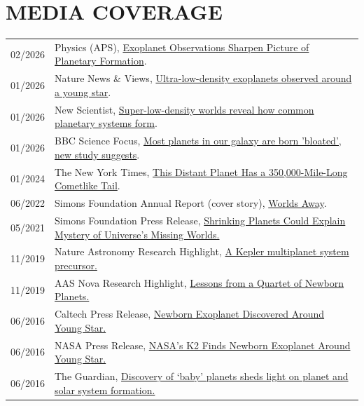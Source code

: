 \section{\large MEDIA COVERAGE}
\begin{tabular}{ll}
02/2026 & Physics (APS), \href{https://physics.aps.org/articles/v19/27}{Exoplanet Observations Sharpen Picture of Planetary Formation}.\\
01/2026 & Nature News \& Views, \href{https://www.nature.com/articles/d41586-025-03983-9}{Ultra-low-density exoplanets observed around a young star}.\\
01/2026 & New Scientist, \href{https://www.newscientist.com/article/2510539-super-low-density-worlds-reveal-how-common-planetary-systems-form/}{Super-low-density worlds reveal how common planetary systems form}.\\
01/2026 & BBC Science Focus, \href{https://www.sciencefocus.com/news/missing-link-planet-forming}{Most planets in our galaxy are born 'bloated', new study suggests}.\\
01/2024 & The New York Times, \href{https://www.nytimes.com/2024/01/12/science/wasp-69b-tail-planet.html}{This Distant Planet Has a 350,000-Mile-Long Cometlike Tail}.\\ 
06/2022 & Simons Foundation Annual Report (cover story), \href{https://annualreports.simonsfoundation.org/2021/worlds-away/}{Worlds Away}.\\
05/2021 & Simons Foundation Press Release, \href{https://www.simonsfoundation.org/2021/05/14/shrinking-planets-could-explain-mystery-of-universes-missing-worlds/}{Shrinking Planets Could Explain Mystery of Universe’s Missing Worlds.}\\
11/2019 & Nature Astronomy Research Highlight, \href{https://www.nature.com/articles/s41550-019-0981-y}{A Kepler multiplanet system precursor.}\\
11/2019 & AAS Nova Research Highlight, \href{https://aasnova.org/2019/11/06/lessons-from-a-quartet-of-newborn-planets/}{Lessons from a Quartet of Newborn Planets.}\\
06/2016 & Caltech Press Release, \href{https://www.caltech.edu/about/news/newborn-exoplanet-discovered-around-young-star-51017}{Newborn Exoplanet Discovered Around Young Star.}\\
06/2016 & NASA Press Release, \href{https://www.nasa.gov/feature/jpl/nasas-k2-finds-newborn-exoplanet-around-young-star}{NASA's K2 Finds Newborn Exoplanet Around Young Star.}\\
06/2016 & The Guardian, \href{https://www.theguardian.com/science/2016/jun/20/baby-planets-givel-first-insights-into-planet-and-solar-system-formation-k233b}{Discovery of `baby' planets sheds light on planet and solar system formation.} \\

\end{tabular}
